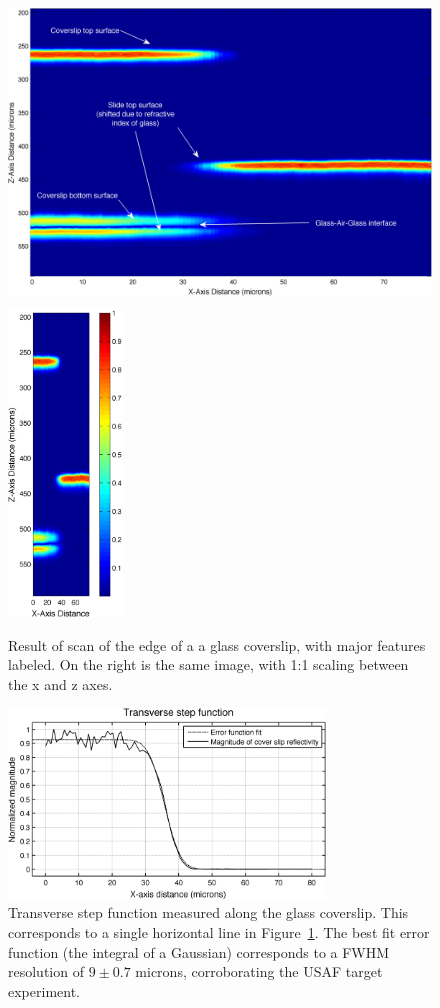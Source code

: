 \begin{figure}[h!]
\centering
\includegraphics[height=230pt]{Images/Results/coverslip_ann.png}
\includegraphics[height=230pt]{Images/Results/coverslip_equal.png}
\caption[Result of scan of the edge of a a glass coverslip.]{Result of scan of the edge of a a glass coverslip, with major features labeled. On the right is the same image, with 1:1 scaling between the x and z axes.\label{fig:coverslip1}}
\end{figure}

\begin{figure}[h!]
\centering
\includegraphics[width=0.75\textwidth]{Images/Results/line_step.png}
\caption[Transverse step function measured along the glass coverslip.]{Transverse step function measured along the glass coverslip. This corresponds to a single horizontal line in Figure~\ref{fig:coverslip1}. The best fit error function (the integral of a Gaussian) corresponds to a FWHM resolution of $9 \pm 0.7$ microns, corroborating the USAF target experiment.\label{fig:coverslip2}}
\end{figure}

